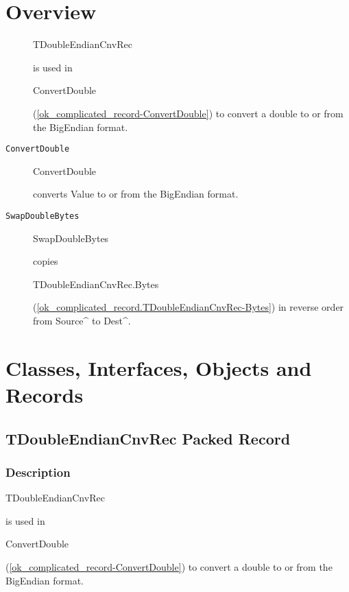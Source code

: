 \documentclass{report}
\begin{document}
\section{Overview}
\begin{description}
\item[\texttt{\begin{ttfamily}TDoubleEndianCnvRec\end{ttfamily} Packed Record}]\begin{ttfamily}TDoubleEndianCnvRec\end{ttfamily} is used in \begin{ttfamily}ConvertDouble\end{ttfamily}(\ref{ok_complicated_record-ConvertDouble}) to convert a double to or from the BigEndian format.
\end{description}
\begin{description}
\item[\texttt{ConvertDouble}]\begin{ttfamily}ConvertDouble\end{ttfamily} converts Value to or from the BigEndian format.
\item[\texttt{SwapDoubleBytes}]\begin{ttfamily}SwapDoubleBytes\end{ttfamily} copies \begin{ttfamily}TDoubleEndianCnvRec.Bytes\end{ttfamily}(\ref{ok_complicated_record.TDoubleEndianCnvRec-Bytes}) in reverse order from Source{\^{}} to Dest{\^{}}.
\end{description}
\section{Classes, Interfaces, Objects and Records}
\subsection*{TDoubleEndianCnvRec Packed Record}
\subsubsection*{\large{\textbf{Description}}\normalsize\hspace{1ex}\hfill}
\begin{ttfamily}TDoubleEndianCnvRec\end{ttfamily} is used in \begin{ttfamily}ConvertDouble\end{ttfamily}(\ref{ok_complicated_record-ConvertDouble}) to convert a double to or from the BigEndian format.\hfill\vspace*{1ex}
\end{document}
